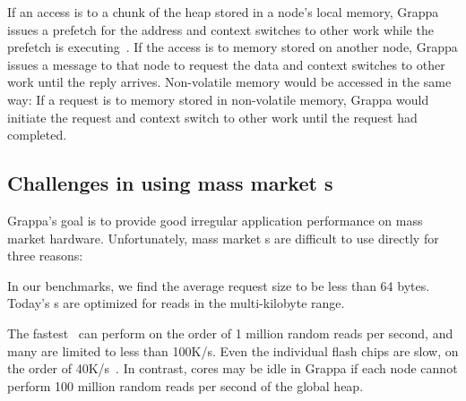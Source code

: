 If an 
access is to a chunk of the heap stored in a node's local memory, Grappa issues a prefetch for the address
and context switches to other work while the prefetch is executing~\cite{Nelson:hotpar2011}. If
the access is to memory stored on another node, Grappa issues a
message to that node to request the data and context switches to other
work until the reply arrives. Non-volatile memory would be accessed in
the same way: If a request is to memory stored in non-volatile memory,
Grappa would initiate the request and context switch to other work
until the request had completed.

\subsection{Challenges in using mass market \hspace{0.75pt}s}
Grappa's goal is to provide good irregular application performance on
mass market hardware. Unfortunately, mass market \hspace{0.75pt}s are
difficult to use directly for three reasons:

 In our benchmarks, we find the average request size to be
less than 64 bytes. Today's \hspace{0.75pt}s are optimized for reads in the
multi-kilobyte range.  

 The fastest~\cite{fusionio} can
perform on the order of 1 million random reads per second, and many
are limited to less than 100K/s. Even the individual flash chips are slow, on the order of 40K/s~\cite{micronFlash}. In contrast, cores may be idle in
Grappa if each node cannot perform 100 million random reads per second of
the global heap. 

